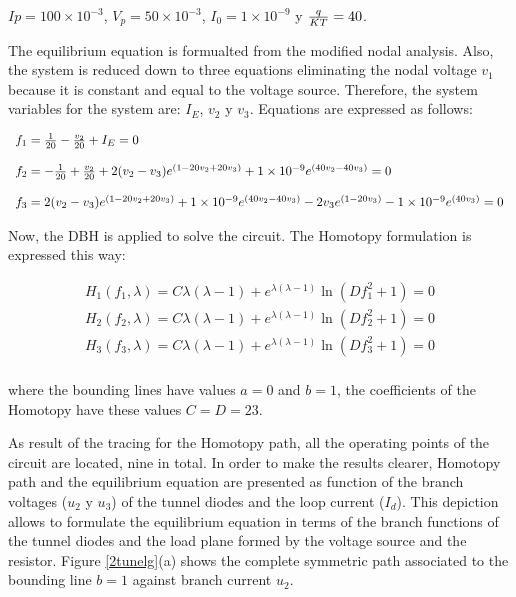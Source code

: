 \documentclass[conference,letterpaper,onecolumn]{IEEEtran}
\begin{document}
$Ip=100 \times 10^{-3}$,
$V_p=50 \times 10^{-3} $, $I_0=1\times 10^{-9}$ y ${q \over {KT}} = 40$. 

The equilibrium equation is formualted from the modified nodal analysis. Also, the system is reduced down to three equations eliminating the nodal voltage $v_1$ because it is constant and equal to the voltage source. Therefore, the system variables for the system are: $I_E$, $v_2$ y $v_3$. Equations are expressed as follows:

\begin{displaymath}
\begin{array}{l}
f_1=  {1 \over 20}-{v_2 \over 20}+I_E =0\\ \\
f_2=  -{1 \over 20}+{v_2 \over 20}+2(v_2-v_3)e^{(1-20v_2+20v_3)} +1\times 10^{-9}e^{(40v_2-40v_3)} =0 \\\\
f_3=  2(v_2-v_3)e^{(1-20v_2+20v_3)}+1\times 10^{-9}e^{(40v_2-40v_3)}-2v_3e^{(1-20v_3)}-1\times 10^{-9} e^{(40v_3)} =0
\end{array}
\end{displaymath}

Now, the DBH is applied to solve the circuit. The Homotopy formulation is expressed this way:

\begin{displaymath}
\begin{array}{c}
H_1(f_1,\lambda)=C\lambda(\lambda-1)+e^{\lambda(\lambda-1)}\ln(Df_1^2+1)=0\\
H_2(f_2,\lambda)=C\lambda(\lambda-1)+e^{\lambda(\lambda-1)}\ln(Df_2^2+1)=0\\
H_3(f_3,\lambda)=C\lambda(\lambda-1)+e^{\lambda(\lambda-1)}\ln(Df_3^2+1)=0\\
\end{array}
\end{displaymath}

where the bounding lines have values $a=0$ and $b=1$, the coefficients of the Homotopy have these values $C=D=23$.

As result of the tracing for the Homotopy path, all the operating points of the circuit are located, nine in total. In order to make the results clearer, Homotopy path and the equilibrium equation are presented as function of the branch voltages ($u_2$ y $u_3$) of the tunnel diodes and the loop current ($I_d$). This depiction allows to formulate the equilibrium equation in terms of the branch functions of the tunnel diodes and the load plane formed by the voltage source and the resistor. Figure \ref{2tunelg}(a) shows the complete symmetric path associated to the bounding line $b=1$ against branch current $u_2$.
\end{document}
